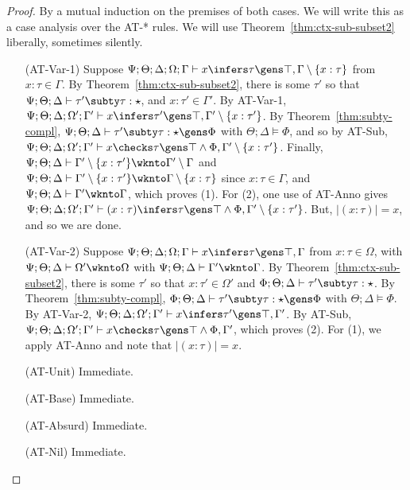 \begin{proof}
By a mutual induction on the premises of both cases. We will write this as a case analysis over the AT-* rules.
We will use Theorem~\ref{thm:ctx-sub-subset2} liberally, sometimes silently.
\begin{itemize}
  \item[(AT-Var-1)] Suppose $\Psi ; \Theta ; \Delta; \Omega ; \Gamma \vdash x \infers \tau \gens \top, \Gamma \setminus \{x : \tau\}$ from $x : \tau \in \Gamma$.
  By Theorem~\ref{thm:ctx-sub-subset2}, there is some $\tau'$ so that $\Psi ; \Theta ; \Delta \vdash \tau' \subty \tau : \star$, and $x : \tau' \in \Gamma'$.
  By AT-Var-1, $\Psi ; \Theta ; \Delta; \Omega' ; \Gamma' \vdash x \infers \tau' \gens \top, \Gamma' \setminus \{x : \tau'\}$.
  By Theorem~\ref{thm:subty-compl},  $\Psi ; \Theta ; \Delta \vdash \tau' \subty \tau : \star \gens \Phi$ with $\Theta ; \Delta \vDash \Phi$, and so by AT-Sub,
  $\Psi ; \Theta ; \Delta; \Omega' ; \Gamma' \vdash x \checks \tau \gens \top \wedge \Phi, \Gamma' \setminus \{x : \tau'\}$. Finally, $\Psi ; \Theta ; \Delta \vdash \Gamma' \setminus \{x : \tau'\} \wknto \Gamma' \setminus \Gamma$ and $\Psi ; \Theta ; \Delta \vdash \Gamma' \setminus \{x : \tau'\} \wknto \Gamma \setminus \{x : \tau\}$ since $x : \tau \in \Gamma$, and $\Psi ; \Theta ; \Delta \vdash \Gamma' \wknto \Gamma$, which proves (1). For (2), one use of AT-Anno gives $\Psi ; \Theta ; \Delta; \Omega' ; \Gamma' \vdash (x : \tau) \infers \tau \gens \top \wedge \Phi, \Gamma' \setminus \{x : \tau'\}$. But, $|(x : \tau)| = x$, and so we are done.
  
  \item[(AT-Var-2)] Suppose $\Psi ; \Theta ; \Delta ; \Omega ; \Gamma\vdash x \infers \tau \gens \top, \Gamma$ from $x : \tau \in \Omega$, with $\Psi ; \Theta ; \Delta \vdash \Omega' \wknto \Omega$ with $\Psi ; \Theta ; \Delta \vdash \Gamma' \wknto \Gamma$. By Theorem~\ref{thm:ctx-sub-subset2}, there is some $\tau'$ so that $x : \tau' \in \Omega'$ and $\Phi ; \Theta ; \Delta \vdash \tau' \subty \tau : \star$. By Theorem~\ref{thm:subty-compl}, $\Phi ; \Theta ; \Delta \vdash \tau' \subty \tau : \star \gens \Phi$ with $\Theta ; \Delta \vDash \Phi$. 
  By AT-Var-2, $\Psi ; \Theta ; \Delta ; \Omega' ; \Gamma' \vdash x \infers \tau' \gens \top, \Gamma'$. By AT-Sub, 
  $\Psi ; \Theta ; \Delta ; \Omega' ; \Gamma' \vdash x \checks \tau \gens \top \wedge \Phi, \Gamma'$, which proves (2). For (1), we apply AT-Anno and note that $|(x : \tau)| = x$.
  
  \item[(AT-Unit)] Immediate.
  \item[(AT-Base)] Immediate.
  \item[(AT-Absurd)] Immediate.
  \item[(AT-Nil)] Immediate.
  

\end{itemize}
\end{proof}
